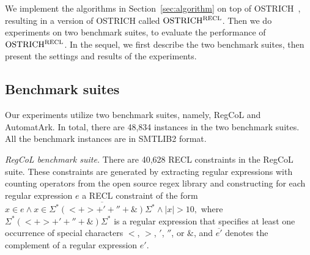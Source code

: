 %

We implement the algorithms in Section~\ref{sec:algorithm} on top of OSTRICH~\cite{ostrich,atva2020}, resulting in a version of OSTRICH called $\rm OSTRICH^{RECL}$.
Then we do experiments on two benchmark suites, to evaluate the performance of $\rm OSTRICH^{RECL}$. In the sequel, we first describe the two benchmark suites, then present the settings and results of the experiments. 


\vspace{-2mm}
\subsection{Benchmark suites}\label{sec:bench}

Our experiments utilize two benchmark suites, namely, RegCoL and AutomatArk. In total, there are 48,834 instances in the two benchmark suites. All the benchmark instances are in SMTLIB2 format. 

\medskip
\noindent
\emph{RegCoL benchmark suite.} There are 40,628 RECL constraints in the RegCoL suite. These constraints are generated by extracting regular expressions with counting operators from the open source regex library \cite{regex_lingua_franca,redos_lenka} and constructing for each regular expression $e$ a RECL constraint of the form 
$x \in e \wedge x \in \overline{\Sigma^*(<+ >+'+''+\&)\Sigma^*} \wedge |x| > 10,$   
where $\Sigma^*(<+ >+'+''+\&)\Sigma^*$ is a regular expression that specifies at least one occurrence of special characters $<$, $>$, $'$, $''$, or $\&$, and $\overline{e'}$ denotes the complement of a regular expression $e'$. 


